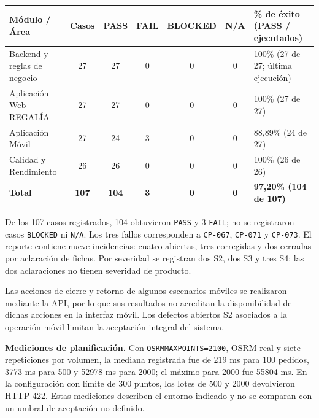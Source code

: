 \documentclass[11pt]{article}
\let\oldtexttt\texttt
\renewcommand{\texttt}[1]{\oldtexttt{\hyphenchar\font=45\relax #1}}
\renewcommand{\_}{\textunderscore\allowbreak}
\begin{document}
\begin{center}
\begin{tabularx}{\textwidth}{|l|c|c|c|c|c|L|}
\hline
\textbf{Módulo / Área} & \textbf{Casos} & \textbf{PASS} & \textbf{FAIL} & \textbf{BLOCKED} & \textbf{N/A} & \textbf{\% de éxito (PASS / ejecutados)} \\ \hline
Backend y reglas de negocio & 27 & 27 & 0 & 0 & 0 & 100\% (27 de 27; última ejecución) \\ \hline
Aplicación Web REGALÍA & 27 & 27 & 0 & 0 & 0 & 100\% (27 de 27) \\ \hline
Aplicación Móvil & 27 & 24 & 3 & 0 & 0 & 88,89\% (24 de 27) \\ \hline
Calidad y Rendimiento & 26 & 26 & 0 & 0 & 0 & 100\% (26 de 26) \\ \hline
\textbf{Total} & \textbf{107} & \textbf{104} & \textbf{3} & \textbf{0} & \textbf{0} & \textbf{97,20\% (104 de 107)} \\ \hline
\end{tabularx}
\end{center}

De los 107 casos registrados, 104 obtuvieron \texttt{PASS} y 3 \texttt{FAIL}; no se registraron
casos \texttt{BLOCKED} ni \texttt{N/A}. Los tres fallos corresponden a \texttt{CP-067},
\texttt{CP-071} y \texttt{CP-073}. El reporte contiene nueve incidencias: cuatro abiertas,
tres corregidas y dos cerradas por aclaración de fichas. Por severidad se registran dos S2,
dos S3 y tres S4; las dos aclaraciones no tienen severidad de producto.\par
Las acciones de cierre y retorno de algunos escenarios móviles se realizaron mediante la API,
por lo que sus resultados no acreditan la disponibilidad de dichas acciones en la interfaz móvil.
Los defectos abiertos S2 asociados a la operación móvil limitan la aceptación integral del sistema.

\medskip\noindent\textbf{Mediciones de planificación.} Con \texttt{OSRM\_MAX\_POINTS=2100},
OSRM real y siete repeticiones por volumen, la mediana registrada fue de 219 ms para 100 pedidos,
3773 ms para 500 y 52978 ms para 2000; el máximo para 2000 fue 55804 ms. En la configuración
con límite de 300 puntos, los lotes de 500 y 2000 devolvieron HTTP 422. Estas mediciones describen
el entorno indicado y no se comparan con un umbral de aceptación no definido.

\end{document}
